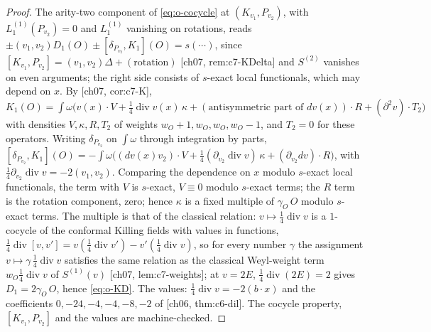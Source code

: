 \begin{proof}
The arity-two component of \eqref{eq:o-cocycle} at $(K_{v_1},P_{v_2})$, with $L_1^{(1)}(P_{v_2})=0$ and $L_1^{(1)}$ vanishing on rotations, reads $\pm(v_1,v_2)D_1(O)\pm[\delta_{P_{v_2}},K_1](O)=s(\cdots)$, since $[K_{v_1},P_{v_2}]=(v_1,v_2)\Delta+(\text{rotation})$ [ch07, rem:c7-KDelta] and $S^{(2)}$ vanishes on even arguments; the right side consists of $s$-exact local functionals, which may depend on $x$. By [ch07, cor:c7-K], $K_1(O)=\int\omega\big(v(x)\cdot V+\tfrac14\operatorname{div}v(x)\,\kappa+(\text{antisymmetric part of }dv(x))\cdot R+(\partial^2v)\cdot T_2\big)$ with densities $V,\kappa,R,T_2$ of weights $w_O+1,w_O,w_O,w_O-1$, and $T_2=0$ for these operators. Writing $\delta_{P_{v_2}}$ on $\int\omega$ through integration by parts, $[\delta_{P_{v_2}},K_1](O)=-\int\omega\big((dv(x)v_2)\cdot V+\tfrac14(\partial_{v_2}\operatorname{div}v)\,\kappa+(\partial_{v_2}dv)\cdot R\big)$, with $\tfrac14\partial_{v_2}\operatorname{div}v=-2(v_1,v_2)$. Comparing the dependence on $x$ modulo $s$-exact local functionals, the term with $V$ is $s$-exact, $V\equiv0$ modulo $s$-exact terms; the $R$ term is the rotation component, zero; hence $\kappa$ is a fixed multiple of $\gamma_O\,O$ modulo $s$-exact terms. The multiple is that of the classical relation: $v\mapsto\tfrac14\operatorname{div}v$ is a $1$-cocycle of the conformal Killing fields with values in functions, $\tfrac14\operatorname{div}[v,v']=v(\tfrac14\operatorname{div}v')-v'(\tfrac14\operatorname{div}v)$, so for every number $\gamma$ the assignment $v\mapsto\gamma\,\tfrac14\operatorname{div}v$ satisfies the same relation as the classical Weyl-weight term $w_O\tfrac14\operatorname{div}v$ of $S^{(1)}(v)$ [ch07, lem:c7-weights]; at $v=2E$, $\tfrac14\operatorname{div}(2E)=2$ gives $D_1=2\gamma_O\,O$, hence \eqref{eq:o-KD}. The values: $\tfrac14\operatorname{div}v=-2(b\cdot x)$ and the coefficients $0,-24,-4,-4,-8,-2$ of [ch06, thm:c6-dil]. The cocycle property, $[K_{v_1},P_{v_2}]$ and the values are machine-checked.
\end{proof}

